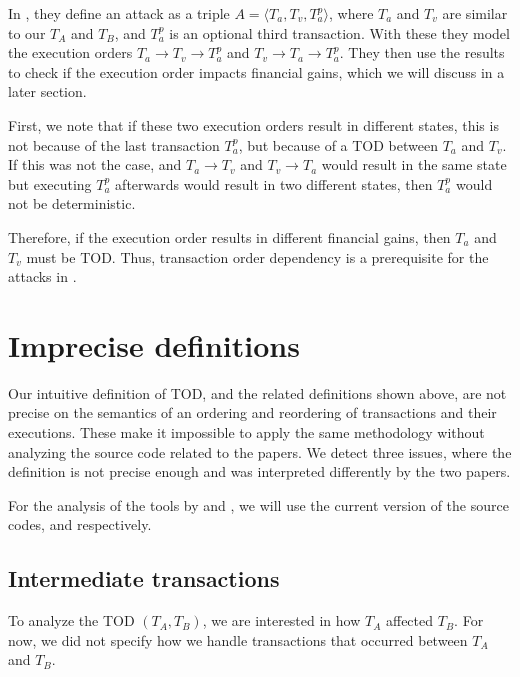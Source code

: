 \documentclass[draft,final]{vutinfth} %
\begin{document}
In \cite{zhang_combatting_2023}, they define an attack as a triple $A = \langle T_a, T_v, T_a^p\rangle$, where $T_a$ and $T_v$ are similar to our $T_A$ and $T_B$, and $T_a^p$ is an optional third transaction. With these they model the execution orders $T_a \rightarrow T_v \rightarrow T_a^p$ and $T_v \rightarrow T_a \rightarrow T_a^p$. They then use the results to check if the execution order impacts financial gains, which we will discuss in a later section.

First, we note that if these two execution orders result in different states, this is not because of the last transaction $T_a^p$, but because of a TOD between $T_a$ and $T_v$. If this was not the case, and $T_a \rightarrow T_v$ and $T_v \rightarrow T_a$ would result in the same state but executing $T_a^p$ afterwards would result in two different states, then $T_a^p$ would not be deterministic.

Therefore, if the execution order results in different financial gains, then $T_a$ and $T_v$ must be TOD. Thus, transaction order dependency is a prerequisite for the attacks in \cite{zhang_combatting_2023}.

\section{Imprecise definitions}

Our intuitive definition of TOD, and the related definitions shown above, are not precise on the semantics of an ordering and reordering of transactions and their executions. These make it impossible to apply the same methodology without analyzing the source code related to the papers. We detect three issues, where the definition is not precise enough and was interpreted differently by the two papers.

For the analysis of the tools by \cite{zhang_combatting_2023} and \cite{torres_frontrunner_2021}, we will use the current version of the source codes, \cite{noauthor_troublorerebus-redgiant_2024} and \cite{noauthor_christoftorresfrontrunner-jones_2024} respectively.

\subsection{Intermediate transactions}

To analyze the TOD $(T_A, T_B)$, we are interested in how $T_A$ affected $T_B$. For now, we did not specify how we handle transactions that occurred between $T_A$ and $T_B$.
\end{document}
